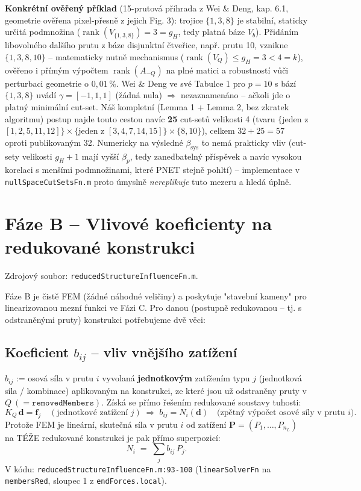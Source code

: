 \documentclass[11pt,a4paper]{article}
\newcommand{\code}[1]{\texttt{#1}}
\newcommand{\rank}{\operatorname{rank}}
\begin{document}
\textbf{Konkrétní ověřený příklad} (15-prutová příhrada z Wei \& Deng, kap. 6.1, geometrie ověřena
pixel-přesně z jejich Fig. 3): trojice $\{1,3,8\}$ je stabilní, staticky určitá podmnožina
($\rank(V_{\{1,3,8\}})=3=g_H$, tedy platná báze $V_b$). Přidáním libovolného dalšího prutu z báze
disjunktní čtveřice, např. prutu 10, vznikne $\{1,3,8,10\}$ -- matematicky nutně mechanismus
($\rank(V_Q)\le g_H=3 < 4=k$), ověřeno i přímým výpočtem $\rank(A_{-Q})$ na plné matici a robustností
vůči perturbaci geometrie o $0{,}01\,\%$. Wei \& Deng ve své Tabulce 1 pro $p=10$ s bází $\{1,3,8\}$
uvádí $\gamma=[-1,1,1]$ (žádná nula) $\Rightarrow$ nezaznamenáno -- ačkoli jde o platný minimální
cut-set. Náš kompletní (Lemma 1 + Lemma 2, bez zkratek algoritmu) postup najde touto cestou navíc
\textbf{25} cut-setů velikosti 4 (tvaru $\{$jeden z $[1,2,5,11,12]\}\times\{$jeden z
$[3,4,7,14,15]\}\times\{8,10\}$), celkem $32+25=57$ oproti publikovaným 32. Numericky na výsledné
$\beta_{\mathrm{sys}}$ to nemá prakticky vliv (cut-sety velikosti $g_H{+}1$ mají vyšší $\beta_p$, tedy
zanedbatelný příspěvek a navíc vysokou korelaci s menšími podmnožinami, které PNET stejně pohltí) --
implementace v \code{nullSpaceCutSetsFn.m} proto úmyslně \emph{nereplikuje} tuto mezeru a hledá úplně.

\section{Fáze B -- Vlivové koeficienty na redukované konstrukci}
\label{sec:faze-b}

Zdrojový soubor: \code{reducedStructureInfluenceFn.m}.

Fáze B je čistě FEM (žádné náhodné veličiny) a poskytuje "stavební kameny" pro linearizovanou mezní
funkci ve Fázi C. Pro danou (postupně redukovanou -- tj. s odstraněnými pruty) konstrukci potřebujeme
dvě věci:

\subsection{Koeficient $b_{ij}$ -- vliv vnějšího zatížení}

$b_{ij}$ := osová síla v prutu $i$ vyvolaná \textbf{jednotkovým} zatížením typu $j$ (jednotková síla /
kombinace) aplikovaným na konstrukci, ze které jsou už odstraněny pruty v $Q\ (=\code{removedMembers})$.
Získá se přímo řešením redukované soustavy tuhosti:
\[
  K_{Q}\,\mathbf d = \mathbf f_j \quad(\text{jednotkové zatížení } j) \;\Longrightarrow\;
  b_{ij} = N_i(\mathbf d) \quad \text{(zpětný výpočet osové síly v prutu $i$)}.
\]
Protože FEM je lineární, skutečná síla v prutu $i$ od zatížení $\mathbf P=(P_1,\dots,P_{n_L})$ na TÉŽE
redukované konstrukci je pak přímo superpozicí:
\[
  N_i \;=\; \sum_j b_{ij}\,P_j.
\]
V kódu: \code{reducedStructureInfluenceFn.m:93-100} (\code{linearSolverFn} na \code{membersRed}, sloupec
1 z \code{endForces.local}).
\end{document}
